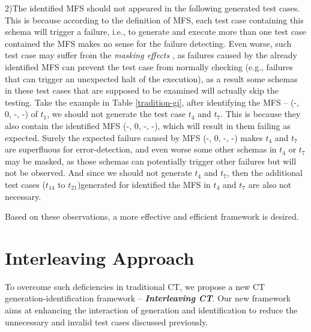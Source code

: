 \documentclass{sig-alternate}
\begin{document}
2)The identified MFS should not appeared in the following generated test cases.  This is because according to the definition of MFS, each test case containing this schema will trigger a failure, i.e., to generate and execute more than one test case contained the MFS makes no sense for the failure detecting. Even worse, such test case may suffer from the \emph{masking effects} \cite{yilmaz2013reducing}, as failures caused by the already identified MFS can prevent the test case from normally checking (e.g., failures that can trigger an unexpected halt of the execution), as a result some schemas in these test cases that are supposed to be examined will actually skip the testing. Take the example in Table \ref{tradition-gi}, after identifying the MFS -- (-, 0, -, -) of $t_{1}$, we should not generate the test case $t_{4}$ and $t_{7}$. This is because they also contain the identified MFS (-, 0, -, -), which will result in them failing as expected. Surely the expected failure caused by MFS (-, 0, -, -) makes $t_{4}$ and $t_{7}$ are superfluous for error-detection, and even worse some other schemas in $t_{4}$ or $t_{7}$  may be masked, as those schemas can potentially trigger other failures but will not be observed. And since we should not generate $t_{4}$ and $t_{7}$, then the additional test cases ($t_{14}$ to $t_{21}$)generated for identified the MFS in $t_{4}$ and $t_{7}$ are also not necessary.

Based on these observations, a more effective and efficient framework is desired.
\section{Interleaving Approach}

To overcome such deficiencies in traditional CT, we propose a new CT generation-identification framework -- \emph{\textbf{Interleaving CT}}. Our new framework aims at enhancing the interaction of generation and identification to reduce the unnecessary and invalid test cases discussed previously.
\end{document}
